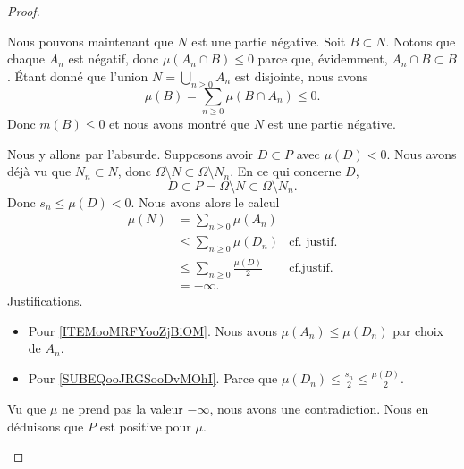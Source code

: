 \begin{proof}
\begin{subproof}
		Nous pouvons maintenant que \( N\) est une partie négative. Soit \( B\subset N\). Notons que chaque \( A_n\) est négatif, donc \( \mu(A_n\cap B)\leq 0\) parce que, évidemment, \( A_n\cap B\subset B\). Étant donné que l'union \( N=\bigcup_{n\geq 0}A_n\) est disjointe, nous avons
		\begin{equation}
			\mu(B)=\sum_{n\geq 0}\mu(B\cap A_n)\leq 0.
		\end{equation}
		Donc \( m(B)\leq 0\) et nous avons montré que \( N\) est une partie négative.

		Nous y allons par l'absurde. Supposons avoir \( D\subset P\) avec \( \mu(D)<0\). Nous avons déjà vu que \( N_n\subset N\), donc $\Omega\setminus N\subset \Omega\setminus N_n$. En ce qui concerne \( D\),
		\begin{equation}
			D\subset P=\Omega\setminus N\subset \Omega\setminus N_n.
		\end{equation}
		Donc \( s_n\leq \mu(D)<0\). Nous avons alors le calcul
		\begin{subequations}
			\begin{align}
				\mu(N) & =\sum_{n\geq 0}\mu(A_n)                                                                \\
				       & \leq \sum_{n\geq 0}\mu(D_n)           & \text{cf. justif.}		\label{ITEMooMRFYooZjBiOM}   \\
				       & \leq \sum_{n\geq 0}\frac{ \mu(D) }{2} & \text{cf.justif. } \label{SUBEQooJRGSooDvMOhI} \\
				       & =-\infty.
			\end{align}
		\end{subequations}
		Justifications.
		\begin{itemize}
			\item
			      Pour \eqref{ITEMooMRFYooZjBiOM}. Nous avons \( \mu(A_n)\leq \mu(D_n)\) par choix de \( A_n\).
			\item
			      Pour \eqref{SUBEQooJRGSooDvMOhI}. Parce que
			      $\mu(D_n)\leq \frac{ s_n }{2}\leq \frac{ \mu(D) }{2}$.
		\end{itemize}
		Vu que \( \mu\) ne prend pas la valeur \( -\infty\), nous avons une contradiction. Nous en déduisons que \( P\) est positive pour \( \mu\).
	\end{subproof}


\end{proof}
